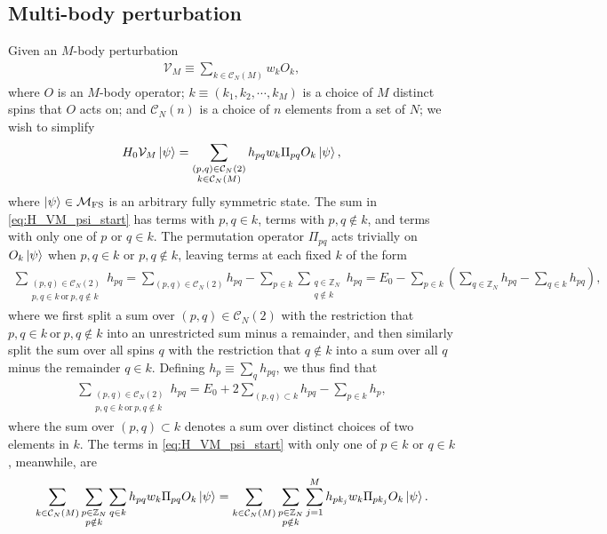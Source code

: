 \documentclass[nofootinbib,notitlepage,11pt]{revtex4-2}
\renewcommand{\t}{\text} %
\newcommand{\p}[1]{\left(#1\right)} %
\newcommand{\1}{\mathds{1}}
\newcommand{\C}{\mathcal{C}}
\newcommand{\M}{\mathcal{M}}
\newcommand{\V}{\mathcal{V}}
\newcommand{\ZZ}{\mathbb{Z}}
\newcommand{\FS}{\text{FS}}
\begin{document}
\subsection{Multi-body perturbation}
\label{sec:H_VM_psi}

Given an $M$-body perturbation
\begin{align}
  \V_M \equiv \sum_{k\in\C_N\p{M}} w_k O_k,
\end{align}
where $O$ is an $M$-body operator; $k\equiv\p{k_1,k_2,\cdots,k_M}$ is
a choice of $M$ distinct spins that $O$ acts on; and $\C_N\p{n}$ is a
choice of $n$ elements from a set of $N$; we wish to simplify
\begin{align}
  H_0 \V_M \ket\psi
  = \sum_{\substack{\p{p,q}\in\C_N\p{2}\\k\in\C_N\p{M}}} h_{pq} w_k
  \Pi_{pq} O_k \ket\psi,
  \label{eq:H_VM_psi_start}
\end{align}
where $\ket\psi\in\M_\FS$ is an arbitrary fully symmetric state.  The
sum in \eqref{eq:H_VM_psi_start} has terms with $p,q\in k$, terms with
$p,q\notin k$, and terms with only one of $p$ or $q\in k$.  The
permutation operator $\Pi_{pq}$ acts trivially on $O_k\ket\psi$ when
$p,q\in k$ or $p,q\notin k$, leaving terms at each fixed $k$ of the
form
\begin{align}
  \sum_{\substack{\p{p,q}\in\C_N\p{2}\\p,q\in k~\t{or}~p,q\notin k}} h_{pq}
  = \sum_{\p{p,q}\in\C_N\p{2}} h_{pq}
  - \sum_{p\in k} \sum_{\substack{q\in\ZZ_N\\q\notin k}} h_{pq}
  = E_0 - \sum_{p\in k}
  \p{\sum_{q\in\ZZ_N} h_{pq} - \sum_{q\in k} h_{pq}},
\end{align}
where we first split a sum over $\p{p,q}\in\C_N\p{2}$ with the
restriction that $p,q\in k~\t{or}~p,q\notin k$ into an unrestricted
sum minus a remainder, and then similarly split the sum over all spins
$q$ with the restriction that $q\notin k$ into a sum over all $q$
minus the remainder $q\in k$.  Defining $h_p\equiv\sum_q h_{pq}$, we thus find that
\begin{align}
  \sum_{\substack{\p{p,q}\in\C_N\p{2}\\p,q\in k~\t{or}~p,q\notin k}} h_{pq}
  = E_0 + 2\sum_{\p{p,q}\subset k} h_{pq} - \sum_{p\in k} h_p,
\end{align}
where the sum over $\p{p,q}\subset k$ denotes a sum over distinct
choices of two elements in $k$.  The terms in
\eqref{eq:H_VM_psi_start} with only one of $p\in k$ or $q\in k$,
meanwhile, are
\begin{align}
  \sum_{k\in\C_N\p{M}} \sum_{\substack{p\in\ZZ_N\\p\notin k}} \sum_{q\in k}
  h_{pq} w_k \Pi_{pq} O_k \ket\psi
  = \sum_{k\in\C_N\p{M}} \sum_{\substack{p\in\ZZ_N\\p\notin k}}
  \sum_{j=1}^M h_{p k_j} w_k \Pi_{p k_j} O_k \ket\psi.
\end{align}
\end{document}
